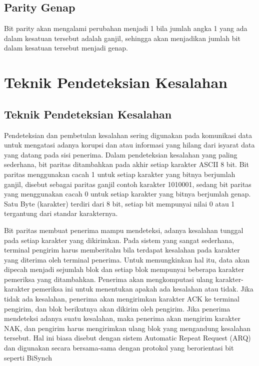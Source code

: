 \subsection{Parity Genap}
Bit parity akan mengalami perubahan  menjadi 1 bila jumlah angka 1 yang ada dalam kesatuan tersebut adalah ganjil, sehingga akan menjadikan jumlah bit dalam kesatuan tersebut menjadi genap.

\section{Teknik Pendeteksian Kesalahan}
\subsection{Teknik Pendeteksian Kesalahan}
Pendeteksian dan pembetulan kesalahan sering digunakan pada komunikasi data untuk mengatasi adanya korupsi dan atau informasi yang hilang dari isyarat data yang datang pada sisi penerima. Dalam pendeteksian kesalahan yang paling sederhana, bit paritas ditambahkan pada akhir setiap karakter ASCII 8 bit. Bit paritas menggunakan cacah 1 untuk setiap karakter yang bitnya berjumlah ganjil, disebut sebagai paritas ganjil contoh karakter 1010001, sedang bit paritas yang menggunakan cacah 0 untuk setiap karakter yang bitnya berjumlah genap. Satu Byte (karakter) terdiri dari 8 bit, setiap bit mempunyai nilai 0 atau 1 tergantung dari standar karakternya.

Bit paritas membuat penerima mampu mendeteksi, adanya kesalahan tunggal pada setiap karakter yang dikirimkan. Pada sistem yang sangat sederhana, terminal pengirim harus memberitahu bila terdapat kesalahan pada karakter yang diterima oleh terminal penerima. Untuk memungkinkan hal itu, data akan dipecah menjadi sejumlah blok dan setiap blok mempunyai beberapa karakter pemeriksa yang ditambahkan. Penerima akan mengkomputasi ulang karakter-karakter pemeriksa ini untuk menentukan apakah ada kesalahan atau tidak. Jika tidak ada kesalahan, penerima akan mengirimkan karakter ACK ke terminal pengirim, dan blok berikutnya akan dikirim oleh pengirim. Jika penerima mendeteksi adanya suatu kesalahan, maka penerima akan mengirim karakter NAK,  dan pengirim harus mengirimkan ulang blok yang mengandung kesalahan tersebut. Hal ini biasa disebut dengan sistem Automatic Repeat Request (ARQ) dan digunakan secara bersama-sama dengan protokol yang berorientasi bit seperti BiSynch




